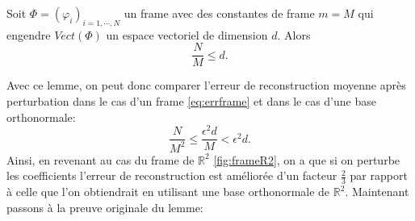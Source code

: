 \begin{lemme}\label{th:dimFrame}
	Soit $\Phi =(\varphi_i)_{i=1, \cdots, N}$ un frame avec des constantes de frame $m=M$ qui engendre $Vect(\Phi)$ un espace vectoriel de dimension $d$.
	Alors
	\begin{equation}
		\frac{N}{M} \leq d.
	\end{equation}
\end{lemme}
Avec ce lemme, on peut donc comparer l'erreur de reconstruction moyenne après perturbation dans le cas d'un frame \ref{eq:errframe} et dans le cas d'une base orthonormale:
\begin{equation}
	\frac{N}{M^2} \leq \frac{\epsilon^2d}{M} < \epsilon^2 d.
\end{equation}
Ainsi, en revenant au cas du frame de $\mathbb{R}^2$ \ref{fig:frameR2}, on a que si on perturbe les coefficients l'erreur de reconstruction est améliorée d'un facteur $\frac{2}{3}$ par rapport à celle que l'on obtiendrait en utilisant une base orthonormale de $\mathbb{R}^2$.
Maintenant passons à la preuve originale du lemme:
